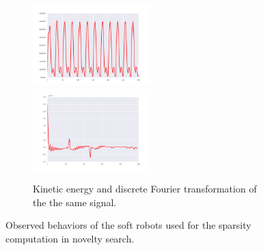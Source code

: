\documentclass{sig-alternate}
\begin{document}
\begin{figure}[t!]
\begin{subfigure}[t]{0.23\textwidth}
\end{subfigure}~
\begin{subfigure}[t]{0.23\textwidth}
\centering
\includegraphics[width=0.5\textwidth]{../Figures/Behaviors/ke.pdf}~
\includegraphics[width=0.5\textwidth]{../Figures/Behaviors/kedft.pdf}
\caption{Kinetic energy and discrete Fourier transformation of the the same signal.}
\end{subfigure}
\caption{Observed behaviors of the soft robots used for the sparsity computation in novelty search.}
\label{fig:Behaviors}
\end{figure}
\end{document}
